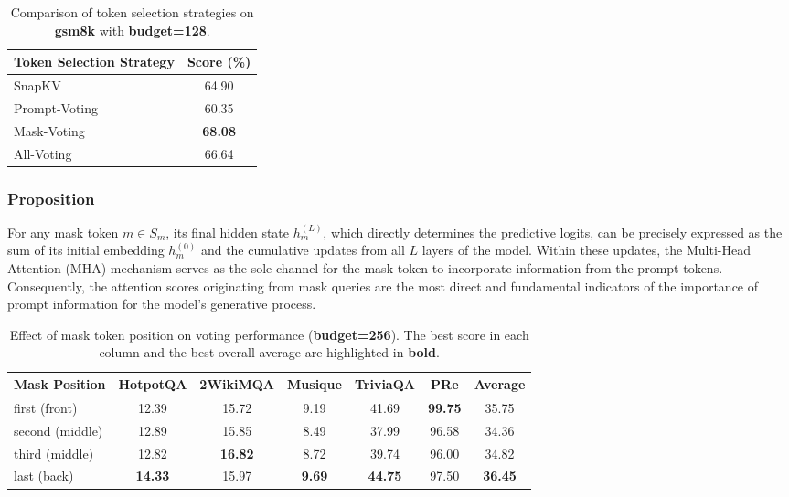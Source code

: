 \begin{table}[t!]
\caption{Comparison of token selection strategies on \textbf{gsm8k} with \textbf{budget=128}.}
\label{tab:voting}
\centering
\begin{tabular}{l c}
\toprule
\textbf{Token Selection Strategy} & \textbf{Score (\%)} \\
\midrule
SnapKV       & 64.90 \\
Prompt-Voting  & 60.35 \\
Mask-Voting    & \textbf{68.08} \\
All-Voting     & 66.64 \\
\bottomrule
\end{tabular}
\end{table}

\subsubsection{Proposition}

For any mask token $m \in S_m$, its final hidden state $h^{(L)}_m$, which directly determines the predictive logits, can be precisely expressed as the sum of its initial embedding $h^{(0)}_m$ and the cumulative updates from all $L$ layers of the model. Within these updates, the Multi-Head Attention (MHA) mechanism serves as the sole channel for the mask token to incorporate information from the prompt tokens. Consequently, the attention scores originating from mask queries are the most direct and fundamental indicators of the importance of prompt information for the model's generative process.

\begin{table}[t!]
    \centering
    \small
    \caption{Effect of mask token position on voting performance (\textbf{budget=256}). The best score in each column and the best overall average are highlighted in \textbf{bold}.}
    \label{tab:mask_voting_position}
    \setlength{\tabcolsep}{5pt}
    \renewcommand{\arraystretch}{1.1}

    \begin{tabular}{@{}lcccccc@{}}
        \toprule
        \textbf{Mask Position} &
        \textbf{HotpotQA} &
        \textbf{2WikiMQA} &
        \textbf{Musique} &
        \textbf{TriviaQA} &
        \textbf{PRe} &
        \textbf{Average} \\
        \midrule
        first (front) & 12.39 & 15.72 & 9.19 & 41.69 & \textbf{99.75} & 35.75 \\
        second (middle) & 12.89 & 15.85 & 8.49 & 37.99 & 96.58 & 34.36 \\
        third (middle) & 12.82 & \textbf{16.82} & 8.72 & 39.74 & 96.00 & 34.82 \\
        last (back) & \textbf{14.33} & 15.97 & \textbf{9.69} & \textbf{44.75} & 97.50 & \textbf{36.45} \\
        \bottomrule
    \end{tabular}
\end{table}



